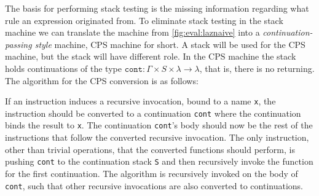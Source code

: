 The basis for performing stack testing is the missing information regarding what rule an expression originated from.
To eliminate stack testing in the stack machine we can translate the machine from \autoref{fig:eval:laznaive} into a \textit{continuation-passing style} machine, CPS machine for short.
A stack will be used for the CPS machine, but the stack will have different role.
In the CPS machine the stack holds continuations of the type $\texttt{cont}: \Gamma \times S \times \lambda \rightarrow \lambda$, that is, there is no returning.
The algorithm for the CPS conversion is as follows:

If an instruction induces a recursive invocation, bound to a name \texttt{x}, the instruction should be converted to a continuation \texttt{cont} where the continuation binds the result to \texttt{x}.
The continuation \texttt{cont}'s body should now be the rest of the instructions that follow the converted recursive invocation.
The only instruction, other than trivial operations, that the converted functions should perform, is pushing \texttt{cont} to the continuation stack \texttt{S} and then recursively invoke the function for the first continuation.
The algorithm is recursively invoked on the body of \texttt{cont}, such that other recursive invocations are also converted to continuations.

